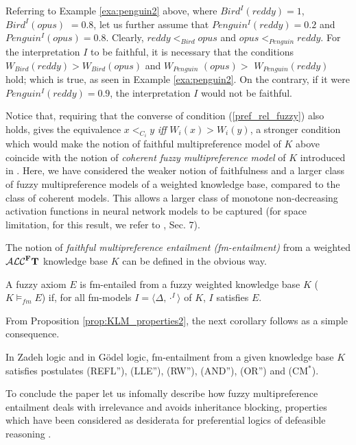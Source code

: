 \documentclass[runningheads]{llncs}
\newcommand{\tip}{{\bf T}}
\newcommand{\alcFt}{\mathcal{ALC}^{\Fe}\tip}
\newcommand {\Fe} {{\bf F}}
\begin{document}
\begin{example}
Referring to Example  \ref{exa:penguin2} above, 
where $\mathit{Bird^I(reddy)=1}$, $\mathit{Bird^I(opus)}$ $=0.8$,  let us further assume that $\mathit{Penguin^I(reddy)=0.2}$ and $\mathit{Penguin^I(opus)=0.8}$.
Clearly, $reddy <_{Bird} opus$ and  $opus <_{Penguin} reddy$. For the interpretation $I$ to be faithful, it is necessary that the conditions $\mathit{W_{Bird}(reddy) > W_{Bird}(opus)}$ and $\mathit{W_{Penguin}}$ $\mathit{(opus) >}$ $\mathit{ W_{Penguin}(reddy)}$ hold; which is true, as seen in Example  \ref{exa:penguin2}.
On the contrary, if it were $\mathit{Penguin^I(reddy)=0.9}$, the interpretation $I$ would not be faithful. 
\end{example}

Notice that, requiring that the converse of condition (\ref{pref_rel_fuzzy}) also holds, gives the equivalence
$x  <_{C_i}  y$ {\em iff} $W_i(x) > W_i(y) $,
a stronger condition which would make the notion of faithful multipreference model of $K$ above coincide with the notion of {\em coherent fuzzy multipreference model} of $K$ introduced in \cite{JELIA2021}. 
Here, we have considered the weaker notion of faithfulness and a larger class of fuzzy multipreference models of a weighted knowledge base, compared to the class of coherent models. 
This allows a larger class of monotone non-decreasing activation functions in neural network models to be captured 
(for space limitation, for this result, we refer to  \cite{arXiv_JELIA2020}, Sec. 7).


The notion of {\em faithful multipreference entailment (fm-entailment)} from a weighted $\alcFt$ knowledge base $K$ can be defined in the obvious way.
\begin{definition}[fm-entailment] \label{fm-entailment}
A fuzzy axiom $E$   {is fm-entailed from a fuzzy weighted knowledge base $K$} ($K \models_{fm} E$)  if, for all fm-models $I=\langle \Delta, \cdot^I \rangle$ of $K$, $I$ satisfies $E$.
\end{definition}
From Proposition \ref{prop:KLM_properties2}, the next corollary follows as a simple consequence.

\begin{corollary}
In Zadeh logic and in G\"odel logic, fm-entailment from a given knowledge base $K$ satisfies postulates (REFL''), (LLE''), (RW''), (AND''), (OR'') and (CM$^*$).
\end{corollary}
To conclude the paper let us 
infomally describe how fuzzy multipreference entailment deals with irrelevance and avoids inheritance blocking, properties which have been considered  as desiderata for preferential logics of defeasible reasoning \cite{Weydert03,Kern-Isberner2014}. 
\end{document}
